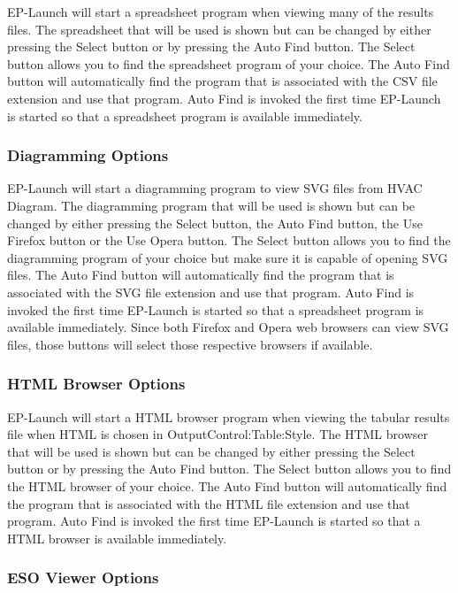 EP-Launch will start a spreadsheet program when viewing many of the results files. The spreadsheet that will be used is shown but can be changed by either pressing the Select button or by pressing the Auto Find button. The Select button allows you to find the spreadsheet program of your choice. The Auto Find button will automatically find the program that is associated with the CSV file extension and use that program. Auto Find is invoked the first time EP-Launch is started so that a spreadsheet program is available immediately.

\subsubsection{Diagramming Options}\label{diagramming-options}

EP-Launch will start a diagramming program to view SVG files from HVAC Diagram. The diagramming program that will be used is shown but can be changed by either pressing the Select button, the Auto Find button, the Use Firefox button or the Use Opera button. The Select button allows you to find the diagramming program of your choice but make sure it is capable of opening SVG files. The Auto Find button will automatically find the program that is associated with the SVG file extension and use that program. Auto Find is invoked the first time EP-Launch is started so that a spreadsheet program is available immediately. Since both Firefox and Opera web browsers can view SVG files, those buttons will select those respective browsers if available.

\subsubsection{HTML Browser Options}\label{html-browser-options}

EP-Launch will start a HTML browser program when viewing the tabular results file when HTML is chosen in OutputControl:Table:Style. The HTML browser that will be used is shown but can be changed by either pressing the Select button or by pressing the Auto Find button. The Select button allows you to find the HTML browser of your choice. The Auto Find button will automatically find the program that is associated with the HTML file extension and use that program. Auto Find is invoked the first time EP-Launch is started so that a HTML browser is available immediately.

\subsubsection{ESO Viewer Options}\label{eso-viewer-options}

